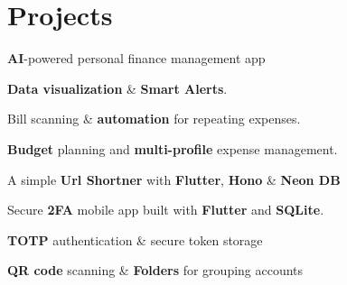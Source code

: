 \documentclass[]{deedy-resume-reversed}
\begin{document}
\begin{minipage}[t]{0.60\textwidth}

\section{Projects}

\begin{tightemize}

\item \textbf{AI}-powered personal finance management app 
\item \textbf{Data visualization} \& \textbf{Smart Alerts}.
\item Bill scanning \& \textbf{automation} for repeating expenses. 
\item \textbf{Budget} planning and \textbf{multi-profile} expense management.
\end{tightemize}
\sectionsep

\begin{tightemize}
\item A simple \textbf{Url Shortner} with \textbf{Flutter}, \textbf{Hono} \& \textbf{Neon DB}
\end{tightemize}

\sectionsep

\begin{tightemize}
\item Secure \textbf{2FA} mobile app built with \textbf{Flutter} and \textbf{SQLite}.
\item \textbf{TOTP} authentication \& secure token storage
\item \textbf{QR code} scanning \& \textbf{Folders} for grouping accounts
\end{tightemize}

\sectionsep

%
%

\end{minipage}
\end{document}
